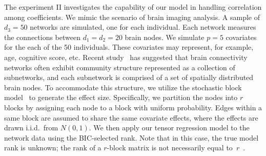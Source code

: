 \documentclass{article}
\theoremstyle{plain}
\theoremstyle{definition}
\begin{document}
The experiment II investigates the capability of our model in handling correlation among coefficients. We mimic the scenario of brain imaging analysis. A sample of $d_3=50$ networks are simulated, one for each individual. Each network measures the connections between $d_1=d_2=20$ brain nodes. We simulate $p=5$ covariates for the each of the 50 individuals. These covariates may represent, for example, age, cognitive score, etc. Recent study~\cite{robinson2015dynamic} has suggested that brain connectivity networks often exhibit community structure represented as a collection of subnetworks, and each subnetwork is comprised of a set of spatially distributed brain nodes. To accommodate this structure, we utilize the stochastic block model~\cite{abbe2017community} to generate the effect size. Specifically, we partition the nodes into $r$ blocks by assigning each node to a block with uniform probability. Edges within a same block are assumed to share the same covariate effects, where the effects are drawn i.i.d.\ from $N(0,1)$. We then apply our tensor regression model to the network data using the BIC-selected rank. Note that in this case, the true model rank is unknown; the rank of a $r$-block matrix is not necessarily equal to~$r$~\cite{zeng2019multiway}. 
\end{document}

